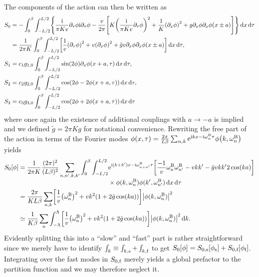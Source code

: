 \documentclass[english, parskip=full]{scrartcl}
\begin{document}
The components of the action can then be written as
\begin{align}
S_0 &= -\intx{0}{\beta}{\intx{-L/2}{L/2}{ \klc*{\frac{\i}{\pi Kv} \partial_\tau \phi \i\partial_\tau \phi - \frac{v}{2\pi}  \klb*{ K \kla*{\frac{\i}{\pi Kv} \partial_\tau\phi}^2 + \frac{1}{K} \kla*{\partial_x\phi}^2 + g\partial_x\phi \partial_x\phi(x\pm a) }} }{x}}{\tau}\\
&= \frac{1}{2\pi K} \intx{0}{\beta}{\intx{-L/2}{L/2}{\klb*{\frac{1}{v}\kla*{\partial_\tau \phi}^2 + v \kla*{\partial_x\phi}^2 + \tilde{g}v \partial_x\phi \partial_x\phi(x\pm a)}}{x}}{\tau},\\
S_1 &= c_1 g_{1,0} \intx{0}{\beta}{\intx{-L/2}{L/2}{\sin(2\phi) \partial_x \phi(x+a,\tau)}{x}}{\tau},\\
S_2 &= c_2 g_{2,0} \intx{0}{\beta}{\intx{-L/2}{L/2}{\cos\kla*{2\phi - 2\phi(x+a,\tau)}}{x}}{\tau},\\
S_3 &= c_3 g_{3,0} \intx{0}{\beta}{\intx{-L/2}{L/2}{\cos\kla*{2\phi + 2\phi(x+a,\tau)}}{x}}{\tau}
\end{align}
where once again the existence of additional couplings with $a\rightarrow -a$ is implied and we defined $\tilde{g}=2\pi K g$ for notational convenience.
Rewriting the free part of the action in terms of the Fourier modes $\phi(x,\tau) = \frac{2\pi}{L\beta} \sum_{n,k} \powe{\i kx - \i\omega_n^\B\tau} \phi\kla*{k,\omega_n^\B}$ yields
\begin{align}
S_0[\phi] &= \frac{1}{2\pi K} \frac{(2\pi)^2}{(L\beta)^2} \sum_{n,n',k,k'} \bsplit{\intx{0}{\beta}{\intx{-L/2}{L/2}{ & \powe{\i (k+k')x - \i \omega_{n+n'}^\B \tau} \klb*{\frac{-1}{v}\omega_n^\B \omega_{n'}^\B - vkk' - \tilde{g} v kk' 2\cos(ka)}\\ 
& \times \phi(k,\omega_n^\B) \phi(k',\omega_{n'}^\B) }{x}}{\tau}} \\
&= \frac{2\pi}{KL\beta} \sum_{n,k} \klb*{\frac{1}{v} \kla*{\omega_n^\B}^2 + vk^2 \kla*{1 + 2\tilde{g} \cos(ka)} } \abs*{\phi(k,\omega_n^\B)}^2 \\
&\simeq \frac{1}{K\beta} \sum_n \intx{-\Lambda}{\Lambda}{\klb*{\frac{1}{v} \kla*{\omega_n^\B}^2 + vk^2 \kla*{1 + 2\tilde{g} \cos(ka)}} \abs*{\phi(k,\omega_n^\B)}^2}{k}.
\end{align}
Evidently splitting this into a ``slow'' and ``fast'' part is rather straightforward since we merely have to identify $\int_k \equiv \int_{k,\text{s}} + \int_{k,\text{f}}$ to get $S_0[\phi] = S_{0,\text{s}}[\phi_{\text{s}}] + S_{0,\text{f}}[\phi_{\text{f}}]$.
Integrating over the fast modes in $S_{0,\text{f}}$ merely yields a global prefactor to the partition function and we may therefore neglect it.\\
\end{document}
